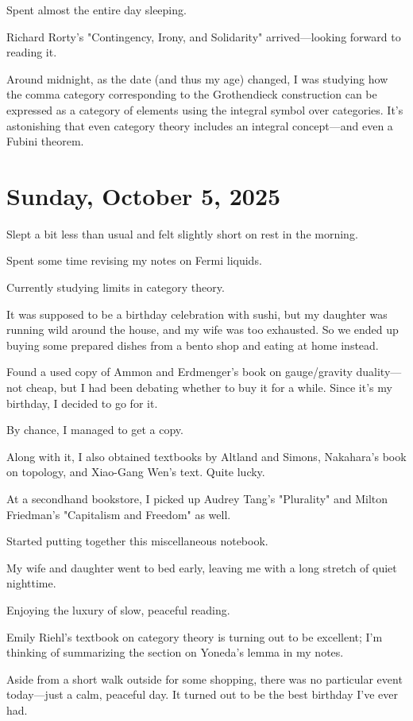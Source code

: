 \documentclass[uplatex]{jsarticle}
\begin{document}
Spent almost the entire day sleeping.

Richard Rorty's "Contingency, Irony, and Solidarity" arrived—looking forward to reading it.

Around midnight, as the date (and thus my age) changed, I was studying how the comma category corresponding to the Grothendieck construction can be expressed as a category of elements using the integral symbol over categories.
It's astonishing that even category theory includes an integral concept—and even a Fubini theorem.



\section{Sunday, October 5, 2025}

Slept a bit less than usual and felt slightly short on rest in the morning.

Spent some time revising my notes on Fermi liquids.

Currently studying limits in category theory.

It was supposed to be a birthday celebration with sushi, but my daughter was running wild around the house, and my wife was too exhausted.
So we ended up buying some prepared dishes from a bento shop and eating at home instead.

Found a used copy of Ammon and Erdmenger's book on gauge/gravity duality—not cheap, but I had been debating whether to buy it for a while.
Since it's my birthday, I decided to go for it.

By chance, I managed to get a copy.

Along with it, I also obtained textbooks by Altland and Simons, Nakahara's book on topology, and Xiao-Gang Wen's text.
Quite lucky.

At a secondhand bookstore, I picked up Audrey Tang's "Plurality" and Milton Friedman's "Capitalism and Freedom" as well.

Started putting together this miscellaneous notebook.

My wife and daughter went to bed early, leaving me with a long stretch of quiet nighttime.

Enjoying the luxury of slow, peaceful reading.

Emily Riehl's textbook on category theory is turning out to be excellent; I'm thinking of summarizing the section on Yoneda's lemma in my notes.

Aside from a short walk outside for some shopping, there was no particular event today—just a calm, peaceful day.
It turned out to be the best birthday I've ever had.
\end{document}
